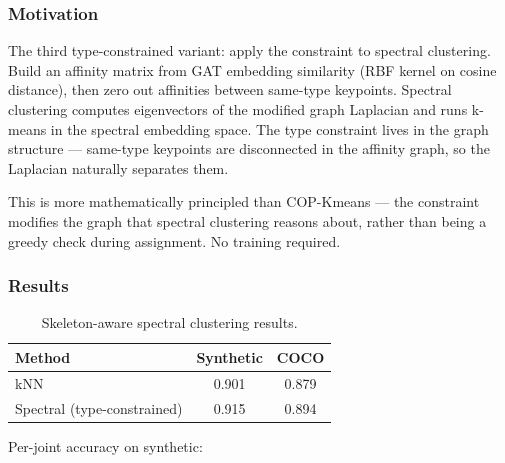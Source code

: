 \subsubsection{Motivation}

The third type-constrained variant: apply the constraint to spectral clustering. Build an affinity matrix from GAT embedding similarity (RBF kernel on cosine distance), then zero out affinities between same-type keypoints. Spectral clustering computes eigenvectors of the modified graph Laplacian and runs k-means in the spectral embedding space. The type constraint lives in the graph structure --- same-type keypoints are disconnected in the affinity graph, so the Laplacian naturally separates them.

This is more mathematically principled than COP-Kmeans --- the constraint modifies the graph that spectral clustering reasons about, rather than being a greedy check during assignment. No training required.


\subsubsection{Results}

\begin{table}[H]
\centering
\footnotesize
\begin{tabular}{lcc}
\toprule
Method & Synthetic & COCO \\
\midrule
kNN & 0.901 & 0.879 \\
Spectral (type-constrained) & 0.915 & 0.894 \\
\bottomrule
\end{tabular}
\caption{Skeleton-aware spectral clustering results.}
\end{table}

Per-joint accuracy on synthetic:

